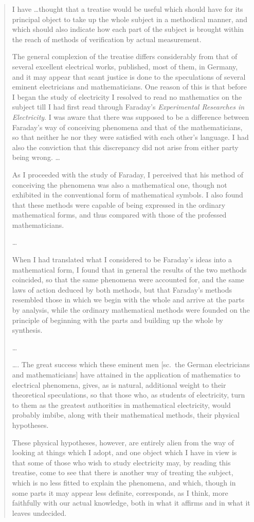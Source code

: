 \begin{quotation}
I have \ldots thought that a treatise would be useful which should have for its principal object to take up the whole subject in a methodical manner, and which should also indicate how each part of the subject is brought within the reach of methods of verification by actual measurement.

The general complexion of the treatise differs considerably from that of several excellent electrical works, published, most of them, in Germany, and it may appear that scant justice is done to the speculations of several eminent electricians and mathematicians. One reason of this is that before I began the study of electricity I resolved to read no mathematics on the subject till I had first read through Faraday's \textit{Experimental Researches in Electricity}. I was aware that there was supposed to be a difference between Faraday's way of conceiving phenomena and that of the mathematicians, so that neither he nor they were satisfied with each other's language. I had also the conviction that this discrepancy did not arise from either party being wrong. \ldots

As I proceeded with the study of Faraday, I perceived that his method of conceiving the phenomena was also a mathematical one, though not exhibited in the conventional form of mathematical symbols. I also found that these methods were capable of being expressed in the ordinary mathematical forms, and thus compared with those of the professed mathematicians.

\ldots

When I had translated what I considered to be Faraday's ideas into a mathematical form, I found that in general the results of the two methods coincided, so that the same phenomena were accounted for, and the same laws of action deduced by both methods, but that Faraday's methods resembled those in which we begin with the whole and arrive at the parts by analysis, while the ordinary mathematical methods were founded on the principle of beginning with the parts and building up the whole by synthesis.

\ldots

\ldots. The great success which these eminent men [sc.~the German electricians and mathematicians] have attained in the application of mathematics to electrical phenomena, gives, as is natural, additional weight to their theoretical speculations, so that those who, as students of electricity, turn to them as the greatest authorities in mathematical electricity, would probably imbibe, along with their mathematical methods, their physical hypotheses.

These physical hypotheses, however, are entirely alien from the way of looking at things which I adopt, and one object which I have in view is that some of those who wish to study electricity may, by reading this treatise, come to see that there is another way of treating the subject, which is no less fitted to explain the phenomena, and which, though in some parts it may appear less definite, corresponds, as I think, more faithfully with our actual knowledge, both in what it affirms and in what it leaves undecided.
\end{quotation} 

